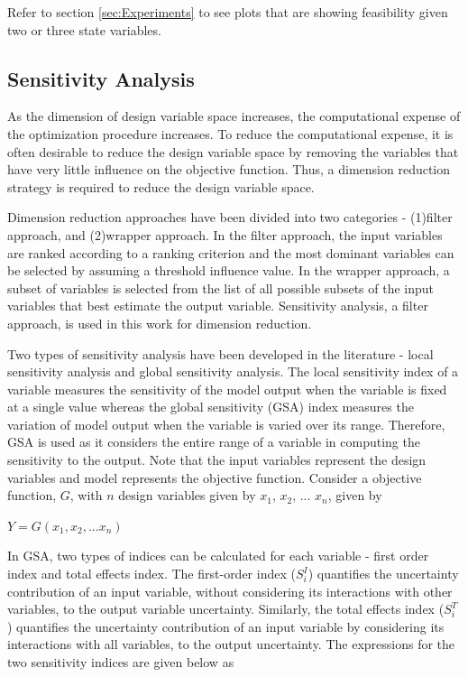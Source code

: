 \documentclass[10pt]{article}
\begin{document}
Refer to section \ref{sec:Experiments} to see plots that are showing feasibility given two or three state variables.

\subsection{Sensitivity Analysis}
\label{subsec:Sensitivity}
\hspace{5 mm} As the dimension of design variable space increases, the computational expense of the optimization procedure increases. To reduce the computational expense, it is often desirable to reduce the design variable space by removing the variables that have very little influence on the objective function. Thus, a dimension reduction strategy is required to reduce the design variable space. 

Dimension reduction approaches have been divided into two categories - (1)filter approach, and (2)wrapper approach. In the filter approach, the input variables are ranked according to a ranking criterion and the most dominant variables can be selected by assuming a threshold influence value. In the wrapper approach, a subset of variables is selected from the list of all possible subsets of the input variables that best estimate the output variable. Sensitivity analysis, a filter approach, is used in this work for dimension reduction. 

Two types of sensitivity analysis have been developed in the literature - local sensitivity analysis and global sensitivity analysis. The local sensitivity index of a variable measures the sensitivity of the model output when the variable is fixed at a single value whereas the global sensitivity (GSA) index measures the variation of model output when the variable is varied over its range. Therefore, GSA is used as it considers the entire range of a variable in computing the sensitivity to the output. Note that the input variables represent the design variables and model represents the objective function.
Consider a objective function, $G$, with $n$ design variables given by $x_{1}$, $x_{2}$, ...  $x_{n}$, given by

\centerline{$Y = G(x_{1}, x_{2}, ... x_{n})$}

In GSA, two types of indices can be calculated for each variable - first order index and total effects index. The first-order index ($S_{i}^{I}$) quantifies the uncertainty contribution of an input variable, without considering its interactions with other variables, to the output variable uncertainty. Similarly, the total effects index ($S_{i}^{T}$) quantifies the uncertainty contribution of an input variable by considering its interactions with all variables, to the output uncertainty. The expressions for the two sensitivity indices are given below as 
\end{document}

